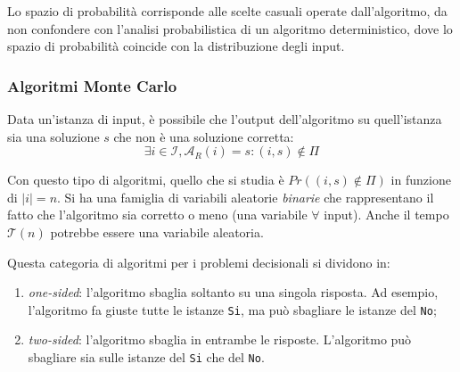 Lo spazio di probabilità corrisponde alle scelte casuali operate dall'algoritmo, da 
non confondere con l'analisi probabilistica di un algoritmo deterministico, dove lo 
spazio di probabilità coincide con la distribuzione degli input.

\subsubsection*{Algoritmi Monte Carlo}
Data un'istanza di input, è possibile che l'output dell'algoritmo su quell'istanza 
sia una soluzione $s$ che non è una soluzione corretta:
\[
    \exists i \in \mathcal{I}, \mathcal{A}_{R}(i) = s:(i,s) \notin \Pi
\]

Con questo tipo di algoritmi, quello che si studia è $Pr((i,s) \notin \Pi)$ in 
funzione di $|i| = n$. Si ha una famiglia di variabili aleatorie \textit{binarie} che 
rappresentano il fatto che l'algoritmo sia corretto o meno (una variabile $\forall$ 
input). Anche il tempo $\mathcal{T}(n)$ potrebbe essere una variabile aleatoria.

Questa categoria di algoritmi per i problemi decisionali si dividono in:
\begin{enumerate}
    \item \textit{one-sided}: l'algoritmo sbaglia soltanto su una singola risposta. 
    Ad esempio, l'algoritmo fa giuste tutte le istanze \verb|Si|, ma può sbagliare 
    le istanze del \verb|No|;
    \item \textit{two-sided}: l'algoritmo sbaglia in entrambe le risposte. L'algoritmo 
    può sbagliare sia sulle istanze del \verb|Si| che del \verb|No|.
\end{enumerate}